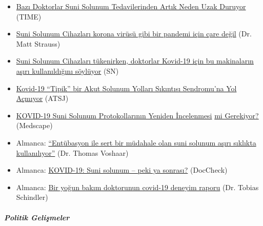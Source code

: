 \begin{itemize}
\tightlist
\item
  \href{https://time.com/5818547/ventilators-coronavirus/}{Bazı
  Doktorlar Suni Solunum Tedavilerinden Artık Neden Uzak Duruyor} (TIME)
\item
  \href{https://www.spectator.co.uk/article/Ventilators-aren-t-a-panacea-for-a-pandemic-like-coronavirus}{Suni
  Solunum Cihazları korona virüsü gibi bir pandemi için çare değil} (Dr.
  Matt Strauss)
\item
  \href{https://www.statnews.com/2020/04/08/doctors-say-ventilators-overused-for-covid-19/}{Suni
  Solunum Cihazları tükenirken, doktorlar Kovid-19 için bu makinaların
  aşırı kullanıldığını söylüyor} (SN)
\item
  \href{https://www.atsjournals.org/doi/pdf/10.1164/rccm.202003-0817LE}{Kovid-19
  ``Tipik'' bir Akut Solunum Yolları Sıkıntısı Sendromu'na Yol Açmıyor}
  (ATSJ)
\item
  \href{https://www.medscape.com/viewarticle/928156}{KOVID-19 Suni
  Solunum Protokollarının Yeniden İncelenmesi}
  \href{https://www.medscape.com/viewarticle/928156}{mi
  Gerekiyor}\href{https://www.medscape.com/viewarticle/928156}{?}
  (Medscape)
\item
  Almanca: \href{https://archive.is/KX5IQ}{``Entübasyon ile sert bir
  müdahale olan suni solunum aşırı sıklıkta kullanılıyor''} (Dr. Thomas
  Voshaar)
\item
  Almanca:
  \href{https://www.doccheck.com/de/detail/articles/26271-covid-19-beatmung-und-dann}{KOVID-19:
  Suni solunum -- peki ya sonrası?} (DocCheck)
\item
  Almanca: \href{https://www.youtube.com/watch?v=JWlouv9QafU}{Bir yoğun
  bakım doktorunun covid-19 deneyim raporu} (Dr. Tobias Schindler)
\end{itemize}

\hypertarget{politik-geliux15fmeler-1}{%
\subparagraph{\texorpdfstring{\textbf{Politik
Gelişmeler}}{Politik Gelişmeler}}\label{politik-geliux15fmeler-1}}

